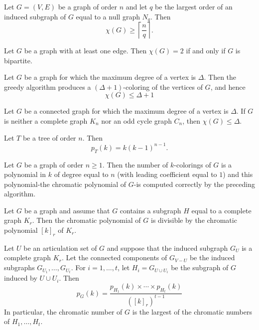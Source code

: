 \begin{corollary}
  \label{cor:12.1.3}
  Let $G=(V, E)$ be a graph of order $n$ and let $q$ be the largest order of an induced subgraph of 
  $G$ equal to a null graph $N_q$. Then
  $$
  \chi(G) \geq\left\lceil\frac{n}{q}\right\rceil .
  $$
\end{corollary}

\begin{theorem}
  \label{thm:12.1.4}
  Let $G$ be a graph with at least one edge. Then $\chi(G) = 2$ if and only if $G$ is bipartite.
\end{theorem}

\begin{theorem}
  \label{thm:12.1.5}
  Let $G$ be a graph for which the maximum degree of a vertex is $\Delta$. Then the greedy algorithm
  produces a $(\Delta+1)$-coloring of the vertices of $G$, and hence
  $$
  \chi(G) \leq \Delta+1
  $$
\end{theorem}

\begin{theorem}
  \label{thm:12.1.6}
  Let $G$ be a connected graph for which the maximum degree of a vertex is $\Delta$. If $G$ is 
  neither a complete graph $K_n$ nor an odd cycle graph $C_n$, then $\chi(G) \leq \Delta$.
\end{theorem}

\begin{theorem}
  \label{thm:12.1.7}
  Let $T$ be a tree of order $n$. Then
  \[ p_T(k) = k(k-1)^{n-1}. \]
\end{theorem}

\begin{theorem}
  \label{thm:12.1.8}
  Let $G$ be a graph of order $n \geq 1$. Then the number of $k$-colorings of $G$ is a polynomial 
  in $k$ of degree equal to $n$ (with leading coefficient equal to $1$) and this polynomial-the 
  chromatic polynomial of $G$-is computed correctly by the preceding algorithm. 
\end{theorem}

\begin{theorem}
  \label{thm:12.1.9}
  Let $G$ be a graph and assume that $G$ contains a subgraph $H$ equal to a complete graph $K_r$. 
  Then the chromatic polynomial of $G$ is divisible by the chromatic polynomial $[k]_r$ of $K_r$.
\end{theorem}

\begin{theorem}
  \label{thm:12.1.10}
  Let $U$ be an articulation set of $G$ and suppose that the induced subgraph $G_U$ is a complete graph $K_r$. Let the connected components of $G_{V-U}$ be the induced subgraphs $G_{U_1}, \ldots, G_{U_t}$. For $i=1, \ldots, t$, let $H_i=G_{U \cup U_i}$ be the subgraph of $G$ induced by $U \cup U_i$. Then
  $$
  p_G(k)=\frac{p_{H_1}(k) \times \cdots \times p_{H_t}(k)}{\left([k]_r\right)^{t-1}}
  $$
  In particular, the chromatic number of $G$ is the largest of the chromatic numbers of $H_1, \ldots, H_t$.
\end{theorem}

